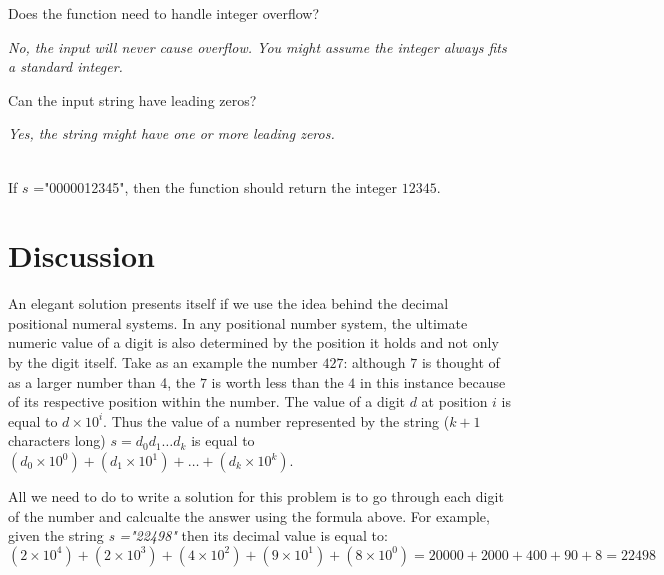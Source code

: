 \begin{QandA}
	\item \begin{questionitem} \begin{question} Does the function need to handle integer overflow?  \end{question} 	 
    \begin{answered}
		\textit{No, the input will never cause overflow. You might assume the integer always fits a standard integer.}
	\end{answered} \end{questionitem}

	\item \begin{questionitem} \begin{question} Can the input string have leading zeros?  \end{question} 	 
    \begin{answered}
		\textit{Yes, the string might have one or more leading zeros.}
		\begin{example}
			\hfill \\
			If $s$ ="0000012345", then the function should return the integer $12345$.	
		\end{example}
	\end{answered} \end{questionitem}
	
\end{QandA}

\section{Discussion}
\label{string_to_int:sec:discussion}
An elegant solution presents itself if we use the idea behind the decimal positional numeral systems.
In any positional number system, the ultimate numeric value of a digit is also determined by the position it holds and not only by the digit itself. 
Take as an example the number $427$:  although $7$ is thought of as a larger number than 4, the $7$ is worth less than the $4$ in this instance because of its respective position within the number. 
The value of a digit $d$ at position $i$ is equal to $d\times 10^i$. Thus the value of a number represented by the string ($k+1$ characters long) $s=d_0d_1 \ldots d_k$ is equal to $(d_0 \times 10^0) + (d_1 \times 10^1) + \ldots + (d_k \times 10^k)$.

All we need to do to write a solution for this problem is to go through each digit of the number and calcualte the answer using the formula above. For example, given the string \textit{s ="22498"} then its decimal value is equal to: $(2 \times 10^4) + (2 \times 10^3) + (4 \times 10^2) + (9 \times 10^1) + (8 \times 10^0) = 20000 + 2000 + 400 +90 +8 = 22498$

